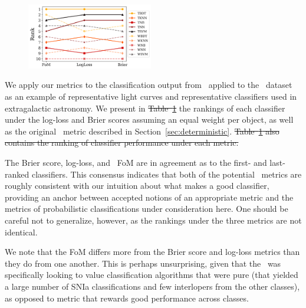 \begin{figure}
	\begin{center}
		\includegraphics[width=0.49\textwidth]{./fig/Tables3_option4.png}
		\caption{
		}
	\end{center}
	\label{fig:snmachineresults}
\end{figure}

We apply our metrics to the classification output from \snmachine\ applied to the \snphotcc\ dataset as an example of representative light curves and representative classifiers used in extragalactic astronomy.
We present in \sout{Table~\ref{fig:snmachineresults}} the rankings of each classifier under the log-loss and Brier scores assuming an equal weight per object, as well as the original \snphotcc\ metric described in Section~\ref{sec:deterministic}.
\sout{Table~\ref{fig:snmachineresults} also contains the ranking of classifier performance under each metric.}

The Brier score, log-loss, and \snphotcc\ FoM are in agreement as to the first- and last-ranked classifiers.
This consensus indicates that both of the potential \plasticc\ metrics are roughly consistent with our intuition about what makes a good classifier, providing an anchor between accepted notions of an appropriate metric and the metrics of probabilistic classifications under consideration here.
One should be careful not to generalize, however, as the rankings under the three metrics are not identical.

We note that the FoM differs more from the Brier score and log-loss metrics than they do from one another.
This is perhaps unsurprising, given that the \snphotcc\ was specifically looking to value classification algorithms that were pure (that yielded a large number of SNIa classifications and few interlopers from the other classes), as opposed to metric that rewards good performance across classes.
